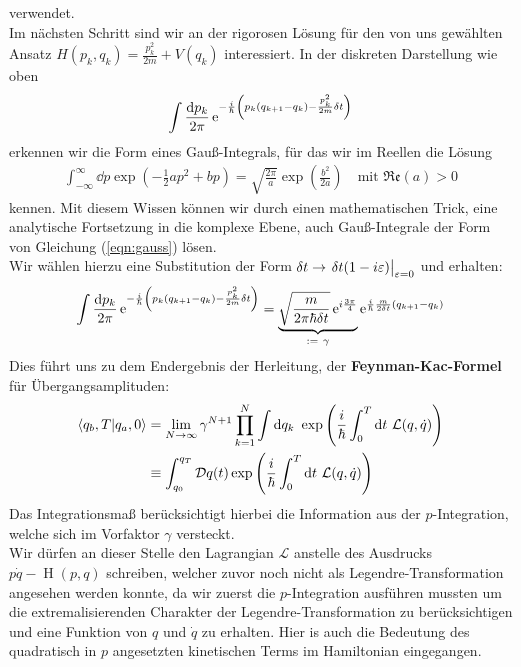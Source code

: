 verwendet. \\ 
Im nächsten Schritt sind wir an der rigorosen Lösung für den von uns gewählten Ansatz $H(p_k,q_k) = \frac{p_k^2}{2m} + V(q_k)$ interessiert. In der diskreten Darstellung wie oben
\begin{align}
	\int\frac{\dd p_k}{2\pi} \operatorname{e}^{-\frac{i}{\hbar}\left(p_k(q_{k+1}-q_k)-\frac{p_k^2}{2m}\delta t\right)} \label{eqn:gauss}
\end{align}
erkennen wir die Form eines Gauß-Integrals, für das wir im Reellen die Lösung 
\begin{align}
	\int_{-\infty}^{\infty}\dd p \exp\left(-\frac{1}{2}a p^2 + b p\right) = \sqrt{\frac{2\pi}{a}}\exp\left(\frac{b^2}{2a}\right) \quad \text{mit } \mathfrak{Re}(a)>0 
\end{align}
kennen. Mit diesem Wissen können wir durch einen mathematischen Trick, eine analytische Fortsetzung in die komplexe Ebene, auch Gauß-Integrale der Form von Gleichung (\ref{eqn:gauss}) lösen. \\
 Wir wählen hierzu eine Substitution der Form $\delta t \rightarrow \eval{\delta t(1- i\varepsilon)}_{\varepsilon=0}$ und erhalten:
 \begin{align}
 	\int\frac{\dd p_k}{2\pi} \operatorname{e}^{-\frac{i}{\hbar}\left(p_k(q_{k+1}-q_k)-\frac{p_k^2}{2m}\delta t\right)} = \underbrace{\sqrt{\frac{m}{2\pi\hbar\delta t}}\operatorname{e}^{i\frac{3\pi}{4}}}_{:= \ \gamma} \operatorname{e}^{\frac{i}{\hbar}\frac{m}{2\delta t}(q_{k+1}-q_k)}
 \end{align}
 Dies führt uns zu dem Endergebnis der Herleitung, der \textbf{Feynman-Kac-Formel} für Übergangsamplituden: 
 \begin{align}
 		 \braket{q_b,T}{q_a,0} &= \lim_{N \rightarrow\infty} \gamma^{N+1}\prod_{k=1}^{N} \int\dd q_k \ \exp\left(\ihbar\int_{0}^{T}\dd t \ \mathcal{L}(q,\dot{q})\right) \nonumber \\
	 &\equiv \int_{q_0}^{q_T} \mathcal{D}q(t) \exp\left(\ihbar\int_{0}^{T}\dd t \ \mathcal{L}(q,\dot{q})\right)
 \end{align}
 Das Integrationsmaß berücksichtigt hierbei die Information aus der $p$-Integration, welche sich im Vorfaktor $\gamma$ versteckt. \\
 Wir dürfen an dieser Stelle den Lagrangian $\mathcal{L}$ anstelle des Ausdrucks \ $p\dot{q} - \operatorname{H}(p,q)$ schreiben, welcher zuvor noch nicht als Legendre-Transformation angesehen werden konnte, da wir zuerst die $p$-Integration ausführen mussten um die extremalisierenden Charakter der Legendre-Transformation zu berücksichtigen  und eine Funktion von $q$ und $\dot{q}$ zu erhalten. Hier is auch die Bedeutung des quadratisch in $p$ angesetzten kinetischen Terms im Hamiltonian eingegangen. 